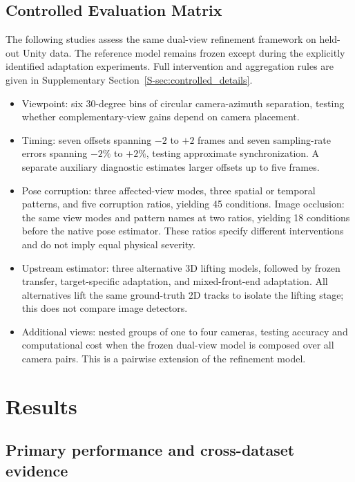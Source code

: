 \documentclass[preprint,12pt]{elsarticle}
\begin{document}
\subsection{Controlled Evaluation Matrix}
\label{subsec:controlled_protocol}

The following studies assess the same dual-view refinement framework on held-out Unity data. The reference model remains frozen except during the explicitly identified adaptation experiments. Full intervention and aggregation rules are given in Supplementary Section~\ref{S-sec:controlled_details}.
\begin{itemize}
    \item Viewpoint: six 30-degree bins of circular camera-azimuth separation, testing whether complementary-view gains depend on camera placement.
    \item Timing: seven offsets spanning \(-2\) to \(+2\) frames and seven sampling-rate errors spanning \(-2\%\) to \(+2\%\), testing approximate synchronization. A separate auxiliary diagnostic estimates larger offsets up to five frames.
    \item Pose corruption: three affected-view modes, three spatial or temporal patterns, and five corruption ratios, yielding 45 conditions. Image occlusion: the same view modes and pattern names at two ratios, yielding 18 conditions before the native pose estimator. These ratios specify different interventions and do not imply equal physical severity.
    \item Upstream estimator: three alternative 3D lifting models, followed by frozen transfer, target-specific adaptation, and mixed-front-end adaptation. All alternatives lift the same ground-truth 2D tracks to isolate the lifting stage; this does not compare image detectors.
    \item Additional views: nested groups of one to four cameras, testing accuracy and computational cost when the frozen dual-view model is composed over all camera pairs. This is a pairwise extension of the refinement model.
\end{itemize}

\section{Results}
\label{sec:results}

\subsection{Primary performance and cross-dataset evidence}
\end{document}
